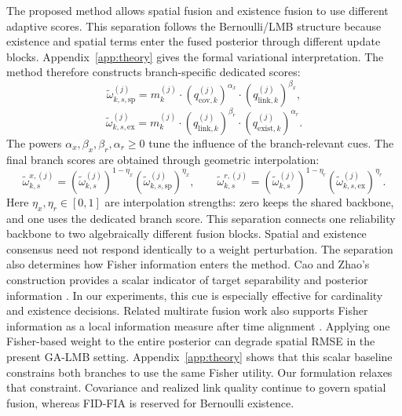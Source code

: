 The proposed method allows spatial fusion and existence fusion to use different adaptive scores. This separation follows the Bernoulli/LMB structure because existence and spatial terms enter the fused posterior through different update blocks. Appendix~\ref{app:theory} gives the formal variational interpretation. The method therefore constructs branch-specific dedicated scores:
\begin{equation}
\label{eq:method-spatial-dedicated-score}
\tilde{\omega}_{k,s,\mathrm{sp}}^{(j)} =
m_k^{(j)}
\cdot
\left(q_{\mathrm{cov},k}^{(j)}\right)^{\alpha_x}
\cdot
\left(q_{\mathrm{link},k}^{(j)}\right)^{\beta_x},
\end{equation}
\begin{equation}
\label{eq:method-existence-dedicated-score}
\tilde{\omega}_{k,s,\mathrm{ex}}^{(j)} =
m_k^{(j)}
\cdot
\left(q_{\mathrm{link},k}^{(j)}\right)^{\beta_r}
\cdot
\left(q_{\mathrm{exist},k}^{(j)}\right)^{\alpha_r}.
\end{equation}
The powers $\alpha_x,\beta_x,\beta_r,\alpha_r \ge 0$ tune the influence of the branch-relevant cues. The final branch scores are obtained through geometric interpolation:
\begin{equation}
\label{eq:method-branch-interpolation}
\tilde{\omega}_{k,s}^{x,(j)}
=
\left(\tilde{\omega}_{k,s}^{(j)}\right)^{1-\eta_x}
\left(\tilde{\omega}_{k,s,\mathrm{sp}}^{(j)}\right)^{\eta_x},
\qquad
\tilde{\omega}_{k,s}^{r,(j)}
=
\left(\tilde{\omega}_{k,s}^{(j)}\right)^{1-\eta_r}
\left(\tilde{\omega}_{k,s,\mathrm{ex}}^{(j)}\right)^{\eta_r}.
\end{equation}
Here $\eta_x,\eta_r\in[0,1]$ are interpolation strengths: zero keeps the shared backbone, and one uses the dedicated branch score.
This separation connects one reliability backbone to two algebraically different fusion blocks. Spatial and existence consensus need not respond identically to a weight perturbation. The separation also determines how Fisher information enters the method. Cao and Zhao's construction provides a scalar indicator of target separability and posterior information \cite{CaoZhao2025InfoGeometryFusion}. In our experiments, this cue is especially effective for cardinality and existence decisions. Related multirate fusion work also supports Fisher information as a local information measure after time alignment \cite{Li2026FIMultirateAADensityFusion}. Applying one Fisher-based weight to the entire posterior can degrade spatial RMSE in the present GA-LMB setting. Appendix~\ref{app:theory} shows that this scalar baseline constrains both branches to use the same Fisher utility. Our formulation relaxes that constraint. Covariance and realized link quality continue to govern spatial fusion, whereas FID-FIA is reserved for Bernoulli existence.

